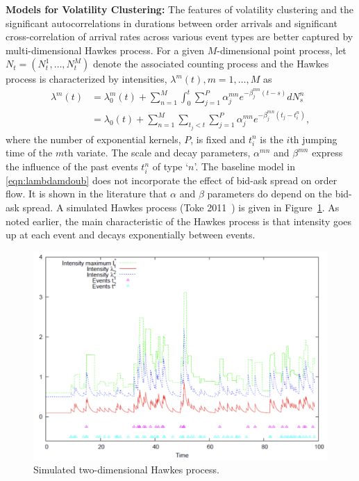 \noindent\textbf{Models for Volatility Clustering:} The features of volatility clustering and the significant autocorrelations in durations between order arrivals and significant cross-correlation of arrival rates across various event types are better captured by multi-dimensional Hawkes process. For a given $M$-dimensional point process, let $N_t=(N_t^1,\ldots,N_t^M)$ denote the associated counting process and the Hawkes process is characterized by intensities, $\lambda^m(t), m=1,\ldots,M$ as
	\begin{equation} \label{eqn:lambdamdoub}
	\begin{split}
	\lambda^m(t)&= \lambda_0^m(t) + \sum_{n=1}^M \int_0^t \sum_{j=1}^P \alpha_j^{mn} e^{-\beta_j^{mn}(t - s)} dN_s^n \\
	&=\lambda_0(t) + \sum_{n=1}^M \sum_{t_j<t} \sum_{j=1}^P \alpha_j^{mn} e^{-\beta_j^{mn}(t_j -t_i^n)},
	\end{split}
	\end{equation}
where the number of exponential kernels, $P$, is fixed and $t_i^n$ is the $i$th jumping time of the $m$th variate. The scale and decay parameters, $\alpha^{mn}$ and $\beta^{mn}$ express the influence of the past events $t_i^n$ of type `$n$'. The baseline model in \eqref{eqn:lambdamdoub} does not incorporate the effect of bid-ask spread on order flow. It is shown in the literature that $\alpha$ and $\beta$ parameters do depend on the bid-ask spread. A simulated Hawkes process (Toke 2011~\cite{toke}) is given in Figure~\ref{fig:hawkes}. As noted earlier, the main characteristic of the Hawkes process is that intensity goes up at each event and decays exponentially between events. 
	\begin{figure}[!ht]
   	\centering
   	\includegraphics[width=\textwidth]{chapters/chapter_trade_data_models/figures/hawkes.png} 
   	\caption{Simulated two-dimensional Hawkes process. \label{fig:hawkes}}
	\end{figure}


